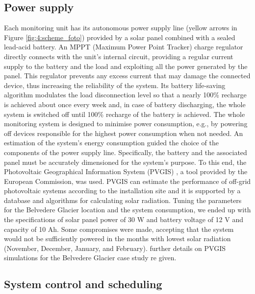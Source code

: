 \subsection{Power supply}\label{Power_supply}
Each monitoring unit has its autonomous power supply line (yellow arrows in Figure
\ref{fig:4:scheme_foto}) provided by a solar panel combined with a sealed lead-acid
battery. An MPPT (Maximum Power Point Tracker) charge regulator directly connects with
the unit's internal circuit, providing a regular current supply to the battery
and the load and exploiting all the power generated by the panel. This regulator prevents
any excess current that may damage the connected device, thus increasing the reliability
of the system. Its battery life-saving algorithm modulates the load disconnection level
so that a nearly 100\% recharge is achieved about once every week and, in case of battery
discharging, the whole system is switched off until 100\% recharge of the battery is
achieved.
The whole monitoring system is designed to minimise power consumption, e.g., by powering
off devices responsible for the highest power consumption when not needed.
An estimation of the system's energy consumption guided the choice of the components of
the power supply line. Specifically, the battery and the associated panel must be
accurately dimensioned for the system's purpose. To this end, the Photovoltaic
Geographical Information System (PVGIS) \citep{pvgis}, a tool provided by the European
Commission, was used. PVGIS can estimate the performance of off-grid photovoltaic systems
according to the installation site and it is supported by a database and algorithms for
calculating solar radiation. Tuning the parameters for the Belvedere Glacier location and
the system consumption, we ended up with the specifications of solar panel power of 30 W
and battery voltage of 12 V and capacity of 10 Ah. Some compromises were made, accepting
that the system would not be sufficiently powered in the months with lowest solar
radiation (November, December, January, and February). {\color{red} further details on
    PVGIS simulations for the Belvedere Glacier case study re given.}

\subsection{System control and scheduling}\label{Control}

